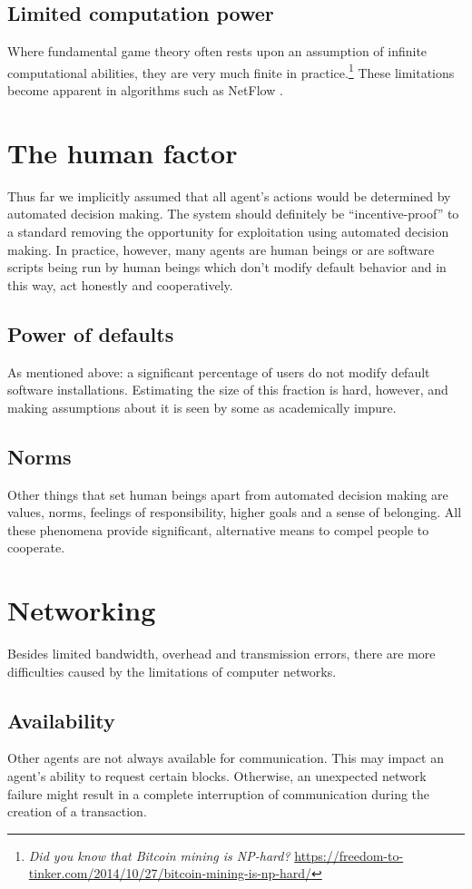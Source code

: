 \subsection{Limited computation power}
Where fundamental game theory often rests upon an assumption of infinite computational abilities, they are very much finite in practice.\footnote{\emph{Did you know that Bitcoin mining is NP-hard?} \url{https://freedom-to-tinker.com/2014/10/27/bitcoin-mining-is-np-hard/}} These limitations become apparent in algorithms such as NetFlow \cite{otte2016sybil}.

\section{The human factor}
Thus far we implicitly assumed that all agent's actions would be determined by automated decision making. The system should definitely be ``incentive-proof'' to a standard removing the opportunity for exploitation using automated decision making. In practice, however, many agents are human beings or are software scripts being run by human beings which don't modify default behavior and in this way, act honestly and cooperatively.

\subsection{Power of defaults}
As mentioned above: a significant percentage of users do not modify default software installations. Estimating the size of this fraction is hard, however, and making assumptions about it is seen by some as academically impure.

\subsection{Norms}
Other things that set human beings apart from automated decision making are values, norms, feelings of responsibility, higher goals and a sense of belonging. All these phenomena provide significant, alternative means to compel people to cooperate.

\section{Networking}
Besides limited bandwidth, overhead and transmission errors, there are more difficulties caused by the limitations of computer networks.

\subsection{Availability}
Other agents are not always available for communication. This may impact an agent's ability to request certain blocks. Otherwise, an unexpected network failure might result in a complete interruption of communication during the creation of a transaction.

